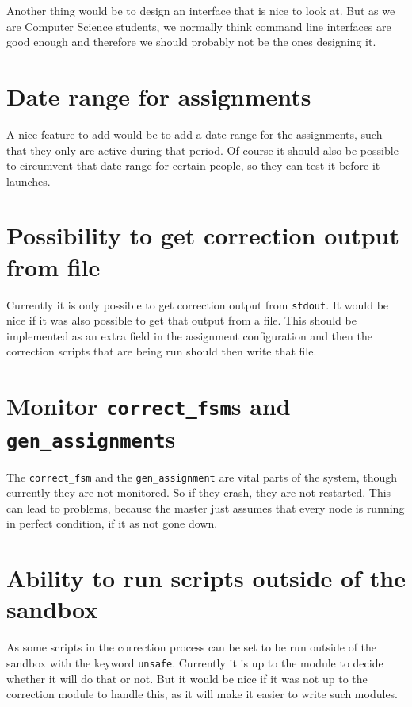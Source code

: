 Another thing would be to design an interface that is nice to look at. But as we
are Computer Science students, we normally think command line interfaces are
good enough and therefore we should probably not be the ones designing it.

\section{Date range for assignments}
A nice feature to add would be to add a date range for the assignments, such
that they only are active during that period. Of course it should also be
possible to circumvent that date range for certain people, so they can test it
before it launches.

\section{Possibility to get correction output from file}
Currently it is only possible to get correction output from \texttt{stdout}. It
would be nice if it was also possible to get that output from a file. This
should be implemented as an extra field in the assignment configuration and then
the correction scripts that are being run should then write that file.

\section{Monitor \texttt{correct\_fsm}s and \texttt{gen\_assignment}s}
The \texttt{correct\_fsm} and the \texttt{gen\_assignment} are vital parts of
the system, though currently they are not monitored. So if they crash, they are
not restarted. This can lead to problems, because the master just assumes that
every node is running in perfect condition, if it as not gone down.

\section{Ability to run scripts outside of the sandbox}
As some scripts in the correction process can be set to be run outside of the
sandbox with the keyword \texttt{unsafe}. Currently it is up to the module to
decide whether it will do that or not. But it would be nice if it was not up to
the correction module to handle this, as it will make it easier to write such
modules.
